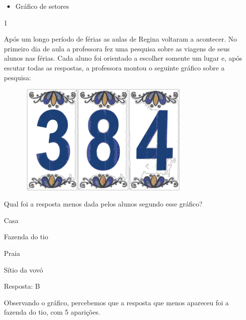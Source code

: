 {\begin{escolha}
{%


\begin{itemize}
\item
  Gráfico de setores
\end{itemize}





\num{1}

Após um longo período de férias as aulas de Regina voltaram a acontecer.
No primeiro dia de aula a professora fez uma pesquisa sobre as viagens de seus alunos nas férias. Cada aluno foi
orientado a escolher somente um lugar e, após escutar todas as respostas,
a professora montou o seguinte gráfico sobre a pesquisa:

\includegraphics[width=4.23077in,height=2.15071in]{media/image92.png}

Qual foi a resposta menos dada pelos alunos segundo esse gráfico?

\begin{escolha}
\item
  Casa
\item
  Fazenda do tio
\item
  Praia
\item
  Sítio da vovó
\end{escolha}

Resposta: B

Observando o gráfico, percebemos que a resposta que menos apareceu foi a
fazenda do tio, com 5 aparições.

}
\end{escolha}}
